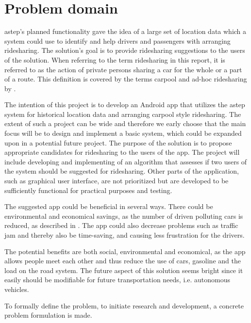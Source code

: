 \section{Problem domain}
\gls{astep}'s planned functionality gave the idea of a large set of location data which a system could use to identify and help drivers and passengers with arranging ridesharing.
The solution's goal is to provide ridesharing suggestions to the users of the solution.
When referring to the term ridesharing in this report, it is referred to as the action of private persons sharing a car for the whole or a part of a route. 
This definition is covered by the terms carpool and ad-hoc ridesharing by \citet{doi:10.1080/01441647.2011.621557}.  

The intention of this project is to develop an Android app that utilizes the \gls{astep} system for historical location data and arranging carpool style ridesharing.
The extent of such a project can be wide and therefore we early choose that the main focus will be to design and implement a basic system, which could be expanded upon in a potential future project.
The purpose of the solution is to propose appropriate candidates for ridesharing to the users of the app.
The project will include developing and implementing of an algorithm that assesses if two users of the system should be suggested for ridesharing.
Other parts of the application, such as graphical user interface, are not prioritized but are developed to be sufficiently functional for practical purposes and testing.

The suggested app could be beneficial in several ways.
There could be environmental and economical savings, as the number of driven polluting cars  is reduced, as described in \cite{doi:10.1080/01441647.2011.621557}.
The app could also decrease problems such as traffic jam and thereby also be time-saving, and causing less frustration for the drivers.

The potential benefits are both social, environmental and economical, as the app allows people meet each other and thus reduce the use of cars, gasoline and the load on the road system.
The future aspect of this solution seems bright since it easily should be modifiable for future transportation needs, i.e. autonomous vehicles.

To formally define the problem, to initiate research and development, a concrete problem formulation is made.